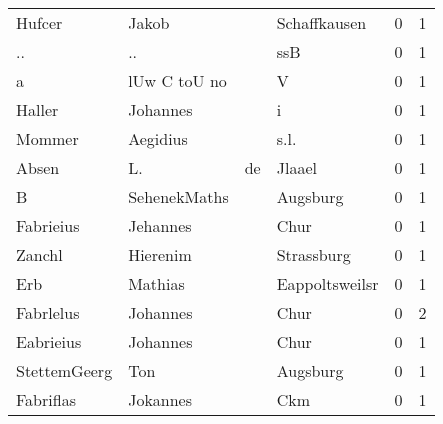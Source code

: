 \begin{center}
\begin{tiny}
\begin{longtabu}{llllrr}
                   Hufcer &                              Jakob &             &                                Schaffkausen &          0 &         1 \\
                       .. &                                 .. &             &                                         ssB &          0 &         1 \\
                        a &                       lUw C toU no &             &                                           V &          0 &         1 \\
                   Haller &                           Johannes &             &                                           i &          0 &         1 \\
                   Mommer &                           Aegidius &             &                                        s.l. &          0 &         1 \\
                    Absen &                                 L. &          de &                                      Jlaael &          0 &         1 \\
                        B &                       SehenekMaths &             &                                    Augsburg &          0 &         1 \\
                Fabrieius &                           Jehannes &             &                                        Chur &          0 &         1 \\
                   Zanchl &                           Hierenim &             &                                  Strassburg &          0 &         1 \\
                      Erb &                            Mathias &             &                              Eappoltsweilsr &          0 &         1 \\
                Fabrlelus &                           Johannes &             &                                        Chur &          0 &         2 \\
                Eabrieius &                           Johannes &             &                                        Chur &          0 &         1 \\
             StettemGeerg &                                Ton &             &                                    Augsburg &          0 &         1 \\
                Fabriflas &                           Jokannes &             &                                         Ckm &          0 &         1 \\

\end{longtabu}
\end{tiny}
\end{center}

